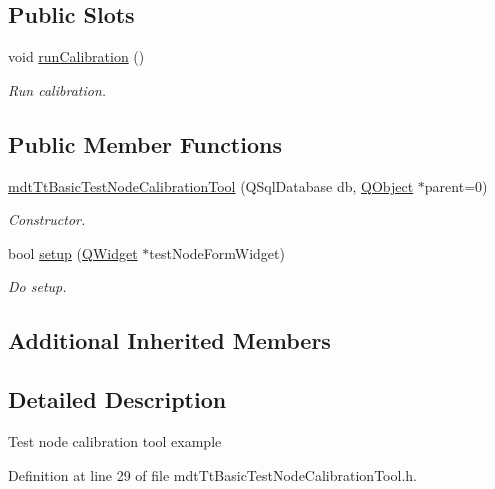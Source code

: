 \subsection*{Public Slots}
\begin{DoxyCompactItemize}
\item 
void \hyperlink{classmdt_tt_basic_test_node_calibration_tool_a0a524857582a178cbea54775cf526985}{run\-Calibration} ()
\begin{DoxyCompactList}\small\item\em Run calibration. \end{DoxyCompactList}\end{DoxyCompactItemize}
\subsection*{Public Member Functions}
\begin{DoxyCompactItemize}
\item 
\hyperlink{classmdt_tt_basic_test_node_calibration_tool_aeddd296806f3e2b7ea99ba220171a3c6}{mdt\-Tt\-Basic\-Test\-Node\-Calibration\-Tool} (Q\-Sql\-Database db, \hyperlink{class_q_object}{Q\-Object} $\ast$parent=0)
\begin{DoxyCompactList}\small\item\em Constructor. \end{DoxyCompactList}\item 
bool \hyperlink{classmdt_tt_basic_test_node_calibration_tool_a471178c597a57866a6cefe86c4fba19e}{setup} (\hyperlink{class_q_widget}{Q\-Widget} $\ast$test\-Node\-Form\-Widget)
\begin{DoxyCompactList}\small\item\em Do setup. \end{DoxyCompactList}\end{DoxyCompactItemize}
\subsection*{Additional Inherited Members}


\subsection{Detailed Description}
Test node calibration tool example 

Definition at line 29 of file mdt\-Tt\-Basic\-Test\-Node\-Calibration\-Tool.\-h.



